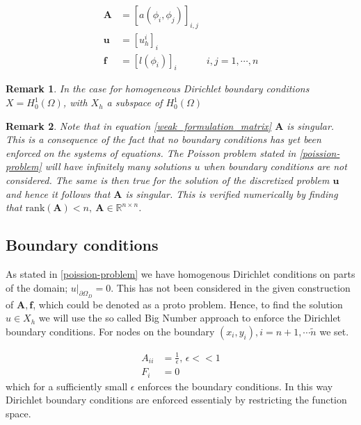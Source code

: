 \documentclass[5pt,a4paper,english]{elsarticle}%
\newcommand{\restr}[2]{\ensuremath{\left.#1\right|_{#2}}}
\newtheorem*{remark}{Remark}
\begin{document}
\begin{equation}
    \begin{aligned}
\bm A &= [a(\phi_i,\phi_j)]_{i,j}
\\ 
\bm u &= [u_h^i]_i
\\
\bm f &= [l(\phi_i)]_i & i,j = 1,\cdots,n
\end{aligned}
\end{equation}
\begin{remark}
    In the case for homogeneous Dirichlet boundary conditions $X = H_0^1(\Omega)$, with $X_h$ a subspace of $H_0^1(\Omega)$ 
\end{remark}
\begin{remark}
Note that in equation \eqref{weak_formulation_matrix} $\bm A$ is singular. 
This is a consequence of the fact that no boundary conditions has yet been enforced on the systems of equations.
The Poisson problem stated in \eqref{poission-problem} will have infinitely many solutions $u$ when boundary conditions are not considered.
The same is then true for the solution of the discretized problem $\bm u$ and hence it follows that $\bm A$ is singular.
This is verified numerically by finding that $\textrm{rank}(\bm A) < n, \ \bm A \in \mathbb{R}^{n \times n}$.
\end{remark}

\subsection{Boundary conditions}
As stated in \eqref{poission-problem} we have homogenous Dirichlet conditions on parts of the domain; $\restr{u}{\partial \Omega_D} =  0 $. This has not been considered in the given construction of $\bm A,\bm f$, which could be denoted as a proto problem. Hence, to find the solution $u \in X_h$ we will use the so called Big Number approach \cite[p. 16]{Lecture_Note_4} to enforce the Dirichlet boundary conditions. For nodes on the boundary $(x_i,y_i), i=n+1,\cdots\tilde n$ we set. 


\begin{equation*}
    \begin{aligned}
    A_{ii} &= \frac{1}{\epsilon}, \, \epsilon << 1 \\
    F_i &= 0
    \end{aligned}
\end{equation*}
which for a sufficiently small $\epsilon$ enforces the boundary conditions. In this way Dirichlet boundary conditions are enforced essentialy by restricting the function space. 
\end{document}
